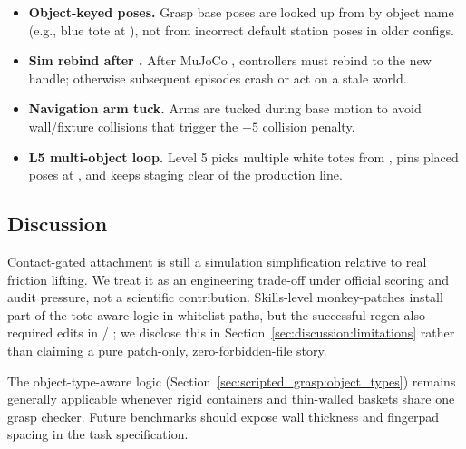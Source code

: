\begin{itemize}[leftmargin=*,itemsep=2pt]
    \item \textbf{Object-keyed poses.} Grasp base poses are looked up from  by object name (e.g., blue tote at ), not from incorrect default station poses in older configs.
    \item \textbf{Sim rebind after .} After MuJoCo , controllers must rebind to the new  handle; otherwise subsequent episodes crash or act on a stale world.
    \item \textbf{Navigation arm tuck.} Arms are tucked during base motion to avoid wall/fixture collisions that trigger the $-5$ collision penalty.
    \item \textbf{L5 multi-object loop.} Level 5 picks multiple white totes from , pins placed poses at , and keeps staging clear of the production line.
\end{itemize}

\subsection{Discussion}
\label{sec:scripted_grasp:discussion}

Contact-gated attachment is still a simulation simplification relative to real friction lifting. We treat it as an engineering trade-off under official scoring and audit pressure, not a scientific contribution. Skills-level monkey-patches install part of the tote-aware logic in whitelist paths, but the successful regen also required edits in  / ; we disclose this in Section~\ref{sec:discussion:limitations} rather than claiming a pure patch-only, zero-forbidden-file story.

The object-type-aware logic (Section~\ref{sec:scripted_grasp:object_types}) remains generally applicable whenever rigid containers and thin-walled baskets share one grasp checker. Future benchmarks should expose wall thickness and fingerpad spacing in the task specification.
